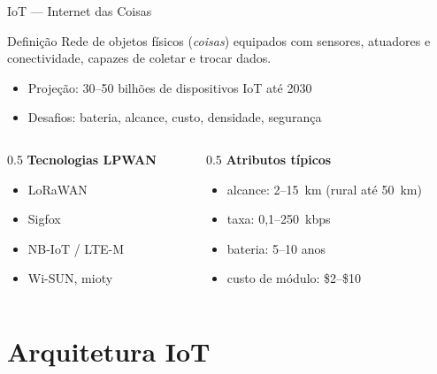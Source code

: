 \documentclass[aspectratio=169,11pt]{beamer}
\begin{document}
\begin{frame}{IoT --- Internet das Coisas}
  \begin{block}{Definição}
    Rede de objetos físicos (\emph{coisas}) equipados com sensores, atuadores e conectividade, capazes de coletar e trocar dados.
  \end{block}
  \begin{itemize}
    \item Projeção: 30--50 bilhões de dispositivos IoT até 2030
    \item Desafios: bateria, alcance, custo, densidade, segurança
  \end{itemize}
  \begin{columns}
    \begin{column}{0.5\textwidth}
      \textbf{Tecnologias LPWAN}
      \begin{itemize}
        \item LoRaWAN
        \item Sigfox
        \item NB-IoT / LTE-M
        \item Wi-SUN, mioty
      \end{itemize}
    \end{column}
    \begin{column}{0.5\textwidth}
      \textbf{Atributos típicos}
      \begin{itemize}
        \item alcance: 2--15~km (rural até 50~km)
        \item taxa: 0,1--250~kbps
        \item bateria: 5--10 anos
        \item custo de módulo: \$2--\$10
      \end{itemize}
    \end{column}
  \end{columns}
\end{frame}

\section{Arquitetura IoT}
\end{document}
